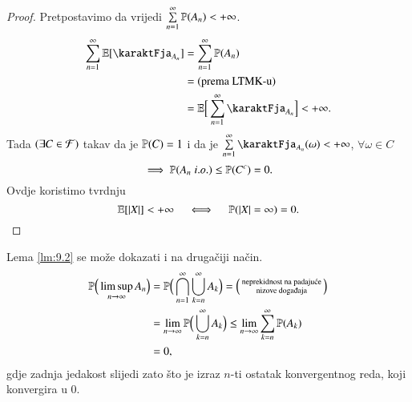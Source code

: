 \begin{proof}
    Pretpostavimo da vrijedi
    $\sum\limits_{n = 1}^{\infty} \mathbb{P}({A_n}) < +\infty$.
    \begin{equation*}
        \begin{aligned}
            \suma{n = 1}{\infty} \masE [ \karaktFja_{A_n} ] &= \suma{n = 1}{\infty} \vjeroj{A_n}\\
            &= (\textnormal{prema LTMK-u})\\
            &= \masE \Big[ \suma{n = 1}{\infty} \karaktFja_{A_n} \Big] < +\infty.
        \end{aligned}
    \end{equation*}
    Tada $(\exists C \in \mathcal{F})$ takav da je $\mathbb{P}({C}) = 1$ i da je $\suma{n = 1}{\infty} \karaktFja_{A_n}(\omega) < +\infty$, $\forall \omega \in C$
    \begin{equation*}
        \implies \mathbb{P}({A_n \; i.o.}) \leq \mathbb{P}({C^c}) = 0. 
    \end{equation*}
    Ovdje koristimo tvrdnju
    \begin{equation*}
        \mathbb{E} [|X|] < +\infty \quad \iff \quad \mathbb{P} (|X| = \infty) = 0.
    \end{equation*}
\end{proof}

\begin{nap} \label{nap:9.2-1}
    Lema \ref{lm:9.2} se mo\v ze dokazati i na druga\v ciji na\v cin.
    \begin{equation*}
        \begin{aligned}
            \masP \Big( \limsup\limits_{n \to \infty} A_n \Big) &= \masP \Big( \presjek{n = 1}{\infty} \unija{k = n}{\infty} A_k \Big) =
            \begin{psmallmatrix}
                \textnormal{neprekidnost na padaju\' ce}\\
                \textnormal{nizove doga\dj aja}
            \end{psmallmatrix}\\
            &= \lim\limits_{n \to \infty} \masP \Big( \unija{k = n}{\infty} A_k \Big) \leq \lim\limits_{n \to \infty} \suma{k = n}{\infty} \masP (A_k)\\
            &= 0,
        \end{aligned}
    \end{equation*}
    gdje zadnja jedakost slijedi zato \v sto je izraz $n$-ti ostatak konvergentnog reda, 
    koji konvergira u 0.
\end{nap}


